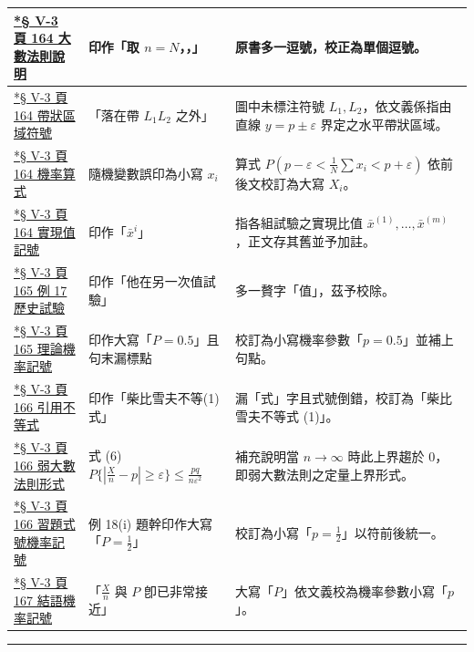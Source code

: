 \documentclass[a4paper,12pt,twoside]{article}
\begin{document}
\begin{xltabular}{\textwidth}{|p{3.2cm}|p{3.8cm}|X|}
\hyperref[note:b5s-ch5-p164-comma]{*§ V-3 頁 164 大數法則說明} & 
印作「取 $n = N$，，」 & 
原書多一逗號，校正為單個逗號。 \\ \hline

\hyperref[note:b5s-ch5-p164-strip]{*§ V-3 頁 164 帶狀區域符號} & 
「落在帶 $L_1 L_2$ 之外」 & 
圖中未標注符號 $L_1, L_2$，依文義係指由直線 $y = p \pm \varepsilon$ 界定之水平帶狀區域。 \\ \hline

\hyperref[note:b5s-ch5-p164-rv]{*§ V-3 頁 164 機率算式} & 
隨機變數誤印為小寫 $x_i$ & 
算式 $P(p-\varepsilon < \frac{1}{N}\sum x_i < p+\varepsilon)$ 依前後文校訂為大寫 $X_i$。 \\ \hline

\hyperref[note:b5s-ch5-p164-xi]{*§ V-3 頁 164 實現值記號} & 
印作「$\bar{x}^i$」 & 
指各組試驗之實現比值 $\bar{x}^{(1)}, \dots, \bar{x}^{(m)}$，正文存其舊並予加註。 \\ \hline

\hyperref[note:b5s-ch5-p165-extra]{*§ V-3 頁 165 例 17 歷史試驗} & 
印作「他在另一次值試驗」 & 
多一贅字「值」，茲予校除。 \\ \hline

\hyperref[note:b5s-ch5-p165-p]{*§ V-3 頁 165 理論機率記號} & 
印作大寫「$P = 0.5$」且句末漏標點 & 
校訂為小寫機率參數「$p = 0.5$」並補上句點。 \\ \hline

\hyperref[note:b5s-ch5-p166-ineq1]{*§ V-3 頁 166 引用不等式} & 
印作「柴比雪夫不等(1)式」 & 
漏「式」字且式號倒錯，校訂為「柴比雪夫不等式 (1)」。 \\ \hline

\hyperref[note:b5s-ch5-p166-wlln]{*§ V-3 頁 166 弱大數法則形式} & 
式 (6) $P\{|\frac{X}{n}-p| \ge \varepsilon\} \le \frac{pq}{n\varepsilon^2}$ & 
補充說明當 $n \to \infty$ 時此上界趨於 0，即弱大數法則之定量上界形式。 \\ \hline

\hyperref[note:b5s-ch5-p166-p]{*§ V-3 頁 166 習題式號機率記號} & 
例 18(i) 題幹印作大寫「$P = \frac{1}{2}$」 & 
校訂為小寫「$p = \frac{1}{2}$」以符前後統一。 \\ \hline

\hyperref[note:b5s-ch5-p167-p]{*§ V-3 頁 167 結語機率記號} & 
「$\frac{X}{n}$ 與 $P$ 卽已非常接近」 & 
大寫「$P$」依文義校為機率參數小寫「$p$」。 \\ \hline

\end{xltabular}

\vspace{1em}
\hrule
\vspace{1em}

\tableofcontents
\newpage


\end{document}
